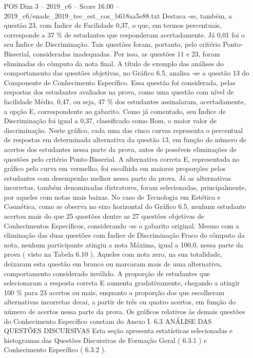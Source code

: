 \begin{textsample}{POS Dim 3 – 2019\_c6 – Score 16.00 – 2019\_c6/enade\_2019\_tec\_est\_cos\_b618aa5e88.txt}
Destaca -se, também, a questão 23, com Índice de Facilidade 0,37, o que, em termos percentuais, corresponde a 37 \% de estudantes que responderam acertadamente.
Já 0,01 foi o seu Índice de Discriminação.
Tais questões foram, portanto, pelo critério Ponto-Bisserial, consideradas inadequadas.
Por isso, as questões 11 e 23, foram eliminadas do cômputo da nota final.
A título de exemplo das análises do comportamento das questões objetivas, no Gráfico 6.5, analisa -se a questão 13 do Componente de Conhecimento Específico.
Essa questão foi considerada, pelas respostas dos estudantes avaliados na prova, como uma questão com nível de facilidade Médio, 0,47, ou seja, 47 \% dos estudantes assinalaram, acertadamente, a opção E, correspondente ao gabarito.
Como já comentado, seu Índice de Discriminação foi igual a 0,37, classificado como Bom, o maior valor de discriminação.
Neste gráfico, cada uma das cinco curvas representa o percentual de respostas em determinada alternativa da questão 13, em função do número de acertos dos estudantes nessa parte da prova, antes de possíveis eliminações de questões pelo critério Ponto-Bisserial.
A alternativa correta E, representada no gráfico pela curva em vermelho, foi escolhida em maiores proporções pelos estudantes com desempenho melhor nessa parte da prova.
Já as alternativas incorretas, também denominadas distratores, foram selecionadas, principalmente, por aqueles com notas mais baixas.
No caso de Tecnologia em Estética e Cosmética, como se observa no eixo horizontal do Gráfico 6.5, nenhum estudante acertou mais do que 25 questões dentre as 27 questões objetivas de Conhecimentos Específicos, considerando -se o gabarito original.
Mesmo com a eliminação das duas questões com Índice de Discriminação Fraco do cômputo da nota, nenhum participante atingiu a nota Máxima, igual a 100,0, nessa parte da prova ( visto na Tabela 6.10 ).
Aqueles com nota zero, na sua totalidade, deixaram esta questão em branco ou marcaram mais de uma alternativa, comportamento considerado inválido.
A proporção de estudantes que selecionaram a resposta correta E aumenta gradativamente, chegando a atingir 100 \% para 23 acertos ou mais, enquanto a proporção dos que escolheram alternativas incorretas decai, a partir de três ou quatro acertos, em função do número de acertos nessa parte da prova.
Os gráficos relativos às demais questões do Conhecimento Específico constam do Anexo I. 6.3 ANÁLISE DAS QUESTÕES DISCURSIVAS Esta seção apresenta estatísticas selecionadas e histogramas das Questões Discursivas de Formação Geral ( 6.3.1 ) e Conhecimento Específico ( 6.3.2 ).

\end{textsample}

